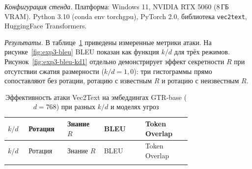 \documentclass[a4paper, 12pt, oneside, openany]{article}
\begin{document}
\emph{Конфигурация стенда.} Платформа: Windows 11, NVIDIA RTX 5060 (8\,ГБ VRAM). Python 3.10 (conda env torchgpu), PyTorch 2.0, библиотека \texttt{vec2text}, HuggingFace Transformers.

\emph{Результаты.} В таблице~\ref{tab:3-vec2text} приведены измеренные метрики атаки. На рисунке~\ref{fig:exp3-bleu} BLEU показан как функция $k/d$ для трёх режимов. Рисунок~\ref{fig:exp3-bleu-kd1} отдельно демонстрирует эффект секретности $R$ при отсутствии сжатия размерности ($k/d = 1{,}0$): три гистограммы прямо сопоставляют без ротации, ротацию с известным $R$ и ротацию с неизвестным $R$.

\begingroup\small\setlength{\tabcolsep}{3pt}
\begin{longtable}{@{}
		>{\centering\arraybackslash}p{0.07\linewidth}
		>{\centering\arraybackslash}p{0.13\linewidth}
		>{\centering\arraybackslash}p{0.16\linewidth}
		>{\centering\arraybackslash}p{0.18\linewidth}
		>{\centering\arraybackslash}p{0.20\linewidth}
		@{}}
	\caption{Эффективность атаки Vec2Text на эмбеддингах GTR-base ($d = 768$) при разных $k/d$ и моделях угроз}\label{tab:3-vec2text}\\*
	\toprule
	$k/d$ & Ротация & Знание $R$ & BLEU & Token Overlap \\
	\midrule
	\endfirsthead

	\toprule
	$k/d$ & Ротация & Знание $R$ & BLEU & Token Overlap \\
	\midrule
	\endhead

	\bottomrule
	\endfoot

	\bottomrule
	\endlastfoot


\end{longtable}
\end{document}
